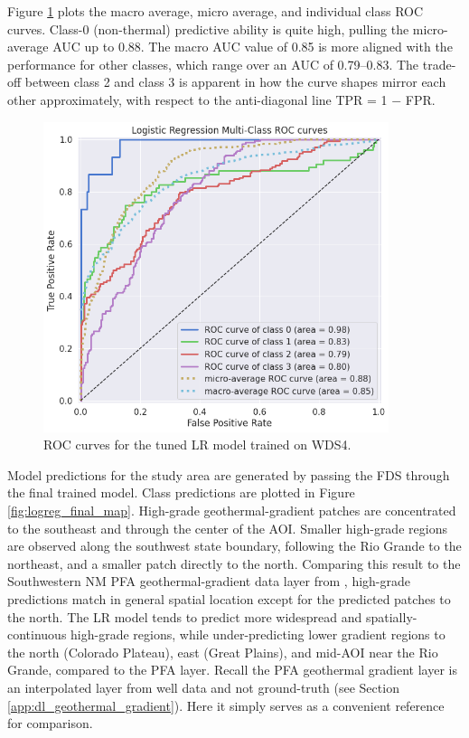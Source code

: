 Figure \ref{fig:logreg_auc} plots the macro average, micro average, and individual class ROC curves. Class-0 (non-thermal) predictive ability is quite high, pulling the micro-average AUC up to 0.88.  The macro AUC value of 0.85 is more aligned with the performance for other classes, which range over an AUC of 0.79--0.83. The trade-off between class 2 and class 3 is apparent in how the curve shapes mirror each other approximately, with respect to the anti-diagonal line TPR = 1 $-$ FPR.

\begin{figure}[!htp]
\centering
\includegraphics[width=0.9\textwidth]{templates/images/Figure-LR-AUC.png}
\singlespacing
\caption[Logistic regression ROC curves]{ROC curves for the tuned LR model trained on WDS4.}
\label{fig:logreg_auc}
\end{figure}

Model predictions for the study area are generated by passing the FDS through the final trained model. Class predictions are plotted in Figure \ref{fig:logreg_final_map}. High-grade geothermal-gradient patches are concentrated to the southeast and through the center of the AOI. Smaller high-grade regions are observed along the southwest state boundary, following the Rio Grande to the northeast, and a smaller patch directly to the north. Comparing this result to the Southwestern NM PFA geothermal-gradient data layer from \citet{bielicki_hydrogeolgic_2015}, high-grade predictions match in general spatial location except for the predicted patches to the north. The LR model tends to predict more widespread and spatially-continuous high-grade regions, while under-predicting lower gradient regions to the north (Colorado Plateau), east (Great Plains), and mid-AOI near the Rio Grande, compared to the PFA layer. Recall the PFA geothermal gradient layer is an interpolated layer from well data and not ground-truth (see Section \ref{app:dl_geothermal_gradient}). Here it simply serves as a convenient reference for comparison.

